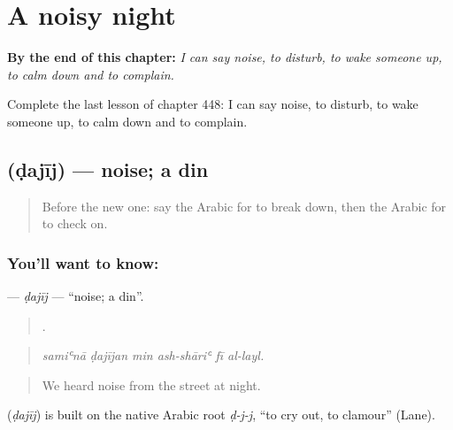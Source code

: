 
\chapter{A noisy night}
\label{ch:ar-a-noisy-night}

\begin{chapteropening}
\textbf{By the end of this chapter:} \emph{I can say noise, to disturb, to wake someone up, to calm down and to complain.}

Complete the last lesson of chapter 448: I can say noise, to disturb, to wake someone up, to calm down and to complain.
\end{chapteropening}

\section[\texorpdfstring{\ar{ضجيج} (ḍajīj)}{ضجيج (ḍajīj)}]{ (ḍajīj) — noise; a din}

\label{lesson:AR-C448-dajij}



\begin{quote}
Before the new one: say the Arabic for to break down, then the Arabic for to check on.
\end{quote}

\subsection*{You'll want to know: }
\textbf{} — \emph{ḍajīj} — \textquotedblleft{}noise; a din\textquotedblright{}.

\begin{quote}
     .
\end{quote}

\begin{quote}
\emph{samiʿnā ḍajījan min ash-shāriʿ fī al-layl.}
\end{quote}

\begin{quote}
We heard noise from the street at night.
\end{quote}

\begin{cousinweb}
\textbf{} (\emph{ḍajīj}) is built on the native Arabic root \emph{ḍ-j-j}, \textquotedblleft{}to cry out, to clamour\textquotedblright{} (Lane).
\end{cousinweb}

